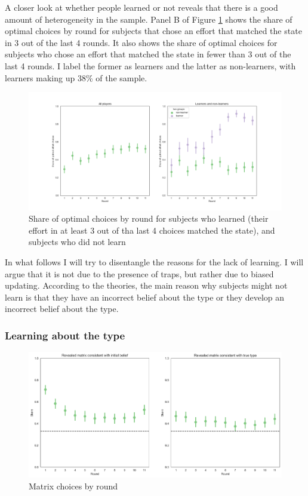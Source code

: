 \documentclass[
  12pt,
]{article}
\begin{document}
A closer look at whether people learned or not reveals that there is a
good amount of heterogeneity in the sample. Panel B of Figure
\ref{fig:learning-by-groups} shows the share of optimal choices by round
for subjects that chose an effort that matched the state in 3 out of the
last 4 rounds. It also shows the share of optimal choices for subjects
who chose an effort that matched the state in fewer than 3 out of the
last 4 rounds. I label the former as learners and the latter as
non-learners, with learners making up 38\% of the sample.

\begin{figure}
\hypertarget{fig:learning-by-groups}{%
\centering
\includegraphics{../figures/learning_groups.png}
\caption{Share of optimal choices by round for subjects who learned
(their effort in at least 3 out of tha last 4 choices matched the
state), and subjects who did not learn}\label{fig:learning-by-groups}
}
\end{figure}

In what follows I will try to disentangle the reasons for the lack of
learning. I will argue that it is not due to the presence of traps, but
rather due to biased updating. According to the theories, the main
reason why subjects might not learn is that they have an incorrect
belief about the type or they develop an incorrect belief about the
type.

\hypertarget{learning-about-the-type}{%
\subsubsection{Learning about the type}\label{learning-about-the-type}}

\begin{figure}
\hypertarget{fig:matrix-choices-by-round}{%
\centering
\includegraphics{../figures/last_button_consistency.png}
\caption{Matrix choices by round}\label{fig:matrix-choices-by-round}
}
\end{figure}
\end{document}
